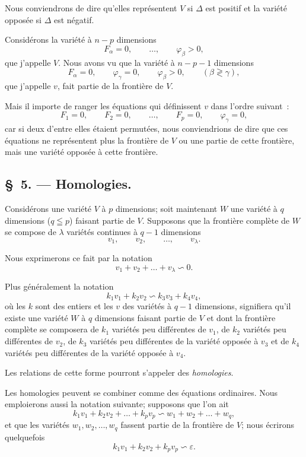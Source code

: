 \documentclass{article}
\begin{document}
Nous conviendrons de dire qu'elles représentent $V$ si $\Delta$ est positif et la variété opposée si $\Delta$ est négatif.

Considérons la variété à $n - p$ dimensions
\[
F_{\alpha} = 0, \qquad \ldots, \qquad \varphi_{\beta} > 0,
\]
que j'appelle $V$. Nous avons vu que la variété à $n - p - 1$ dimensions
\[
F_{\alpha} = 0, \qquad \varphi_{\gamma} = 0, \qquad \varphi_{\beta} > 0, \qquad (\beta \gtrless \gamma),
\]
que j'appelle $v$, fait partie de la frontière de $V$.

Mais il importe de ranger les équations qui définissent $v$ dans l'ordre suivant~:
\[
F_{1} = 0, \qquad F_{2} = 0, \qquad \ldots, \qquad F_{p} = 0, \qquad \varphi_{\gamma} = 0,
\]
car si deux d'entre elles étaient permutées, nous conviendrions de dire que ces équations ne représentent plus la frontière de $V$ ou une partie de cette frontière, mais une variété opposée à cette frontière.

\subsection*{\S~5. --- Homologies.}

Considérons une variété $V$ à $p$ dimensions; soit maintenant $W$ une variété à $q$ dimensions ($q \leqq p$) faisant partie de $V$. Supposons que la frontière complète de $W$ se compose de $\lambda$ variétés continues à $q - 1$ dimensions
\[
v_{1}, \qquad v_{2}, \qquad \ldots, \qquad v_{\lambda}.
\]

Nous exprimerons ce fait par la notation
\[
v_{1} + v_{2} + \ldots + v_{\lambda} \backsim 0.
\]

Plus généralement la notation
\[
k_{1}v_{1} + k_{2}v_{2} \backsim k_{3}v_{3} + k_{4}v_{4},
\]
où les $k$ sont des entiers et les $v$ des variétés à $q - 1$ dimensions, signifiera qu'il existe une variété $W$ à $q$ dimensions faisant partie de $V$ et dont la frontière complète se composera de $k_{1}$ variétés peu différentes de $v_{1}$, de $k_{2}$ variétés peu différentes de $v_{2}$, de $k_{3}$ variétés peu différentes de la variété
opposée à $v_{3}$ et de $k_{4}$ variétés peu différentes de la variété opposée à $v_{4}$.

Les relations de cette forme pourront s'appeler des \emph{homologies}.

Les homologies peuvent se combiner comme des équations ordinaires. Nous emploierons aussi la notation suivante; supposons que l'on ait
\[
k_{1}v_{1} + k_{2}v_{2} + \ldots + k_{p}v_{p} \backsim w_{1} + w_{2} + \ldots + w_{q},
\]
et que les variétés $w_{1}, w_{2}, \ldots, w_{q}$ fassent partie de la frontière de $V$; nous écrirons quelquefois
\[
k_{1}v_{1} + k_{2}v_{2} + k_{p}v_{p} \backsim \varepsilon.
\]
\end{document}
